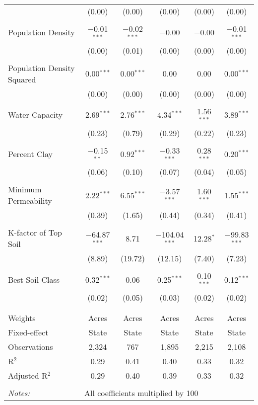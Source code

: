 \documentclass[10pt]{article}
\begin{document}
\begin{table}[!htbp]
\begin{tabular}{@{\extracolsep{5pt}}lccccc}
  & (0.00) & (0.00) & (0.00) & (0.00) & (0.00) \\ 
  & & & & & \\ 
 Population Density & $-$0.01$^{***}$ & $-$0.02$^{***}$ & $-$0.00 & $-$0.00 & $-$0.01$^{***}$ \\ 
  & (0.00) & (0.01) & (0.00) & (0.00) & (0.00) \\ 
  & & & & & \\ 
 Population Density Squared & 0.00$^{***}$ & 0.00$^{***}$ & 0.00 & 0.00 & 0.00$^{***}$ \\ 
  & (0.00) & (0.00) & (0.00) & (0.00) & (0.00) \\ 
  & & & & & \\ 
 Water Capacity & 2.69$^{***}$ & 2.76$^{***}$ & 4.34$^{***}$ & 1.56$^{***}$ & 3.89$^{***}$ \\ 
  & (0.23) & (0.79) & (0.29) & (0.22) & (0.23) \\ 
  & & & & & \\ 
 Percent Clay & $-$0.15$^{**}$ & 0.92$^{***}$ & $-$0.33$^{***}$ & 0.28$^{***}$ & 0.20$^{***}$ \\ 
  & (0.06) & (0.10) & (0.07) & (0.04) & (0.05) \\ 
  & & & & & \\ 
 Minimum Permeability & 2.22$^{***}$ & 6.55$^{***}$ & $-$3.57$^{***}$ & 1.60$^{***}$ & 1.55$^{***}$ \\ 
  & (0.39) & (1.65) & (0.44) & (0.34) & (0.41) \\ 
  & & & & & \\ 
 K-factor of Top Soil & $-$64.87$^{***}$ & 8.71 & $-$104.04$^{***}$ & 12.28$^{*}$ & $-$99.83$^{***}$ \\ 
  & (8.89) & (19.72) & (12.15) & (7.40) & (7.23) \\ 
  & & & & & \\ 
 Best Soil Class & 0.32$^{***}$ & 0.06 & 0.25$^{***}$ & 0.10$^{***}$ & 0.12$^{***}$ \\ 
  & (0.02) & (0.05) & (0.03) & (0.02) & (0.02) \\ 
  & & & & & \\ 
\hline \\[-1.8ex] 
Weights & Acres & Acres & Acres & Acres & Acres \\ 
Fixed-effect & State & State & State & State & State \\ 
Observations & 2,324 & 767 & 1,895 & 2,215 & 2,108 \\ 
R$^{2}$ & 0.29 & 0.41 & 0.40 & 0.33 & 0.32 \\ 
Adjusted R$^{2}$ & 0.29 & 0.40 & 0.39 & 0.33 & 0.32 \\ 
\hline 
\hline \\[-1.8ex] 
\textit{Notes:} & \multicolumn{5}{l}{All coefficients multiplied by 100} \\ 
\end{tabular} 
\end{table} 
\end{document}
